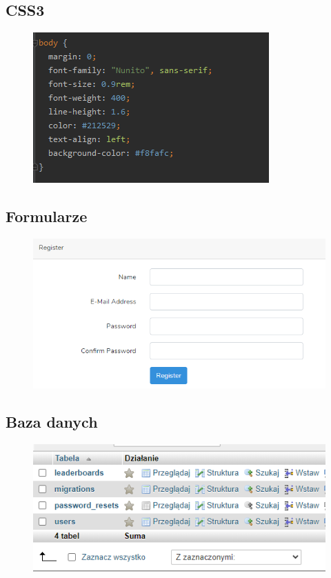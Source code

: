 \documentclass[11pt,a4paper]{article}
\begin{document}
\subsection{\textbf{CSS3}}
\begin{figure} [h]
\centering
\includegraphics {1.2.png}
\end{figure}
\newpage
\subsection{\textbf{Formularze}}
\begin{figure} [h]
\centering
\includegraphics {1.3.png}
\end{figure}
\subsection{\textbf{Baza danych}}
\begin{figure} [h]
\centering
\includegraphics {1.4.png}
\end{figure}
\newpage
\end{document}
